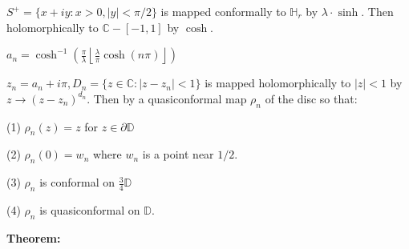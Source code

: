 \documentclass{beamer}
\begin{document}
\begin{frame} 

{\tiny $S^+ = \{ x + iy : x > 0, |y| < \pi/2 \}$ is mapped conformally to $\mathbb{H}_r$ by $\lambda\cdot\sinh$. Then holomorphically to $\mathbb{C} - [-1,1]$ by $\cosh$.

\vspace{2.5mm}

$a_n = \cosh^{-1}\left( \frac{\pi}{\lambda} \left \lfloor{ \frac{\lambda}{\pi} \cosh(n\pi) }\right \rfloor \right)$

\vspace{2.5mm}

$z_n = a_n + i\pi, D_n = \{ z \in \mathbb{C} : \left| z - z_n \right| < 1\} $ is mapped holomorphically to $|z|<1$ by $z\rightarrow (z - z_n)^{d_n}$. Then by a quasiconformal map $\rho_n$ of the disc so that: 

\hspace{5mm} (1) $\rho_n(z)=z$ for $z\in\partial\mathbb{D}$

\hspace{5mm} (2) $\rho_n(0)=w_n$ where $w_n$ is a point near $1/2$.

\hspace{5mm} (3) $\rho_n$ is conformal on $\frac{3}{4}\mathbb{D}$

\hspace{5mm} (4) $\rho_n$ is quasiconformal on $\mathbb{D}$.  

}

\vspace{5mm}

{\bf Theorem:} 


\end{frame}
\end{document}
